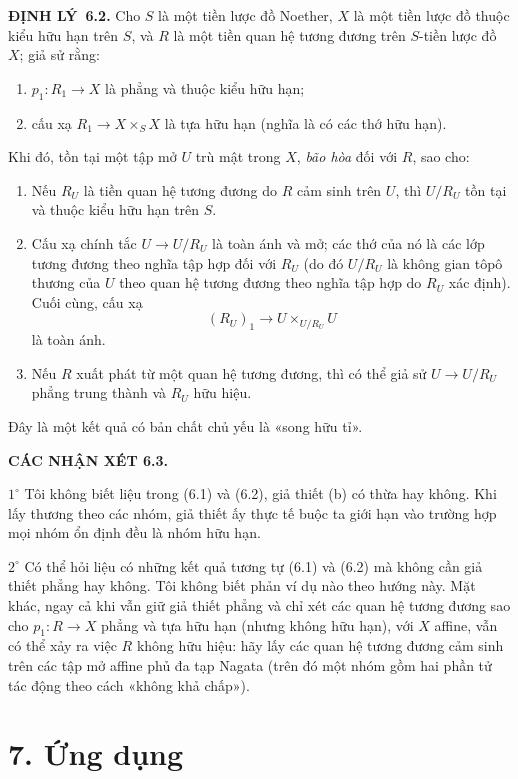 \documentclass[11pt,twoside,openany]{book}
\numberwithin{equation}{section}
\newcommand{\src}[1]{%
  \phantomsection\hypertarget{src:\fgasourceid:#1}{}%
  \marginpar{\raggedleft\footnotesize\sffamily #1}%
}
\newcommand{\fgasourceid}{unset}
\newcommand{\fsection}[2]{%
  \section*{#1. #2}%
  \addcontentsline{toc}{section}{#1. #2}%
}
\newcommand{\result}[2]{\par\medskip\noindent\textbf{#1\if\relax\detokenize{#2}\relax\else\ #2\fi.}\quad}
\begin{document}
\result{ĐỊNH LÝ}{6.2} Cho $S$ là một tiền lược đồ Noether, $X$ là một tiền
lược đồ thuộc kiểu hữu hạn trên $S$, và $R$ là một tiền quan hệ tương đương trên
$S$-tiền lược đồ $X$; giả sử rằng:
\begin{enumerate}
\item[(a)] $p_1:R_1\to X$ là phẳng và thuộc kiểu hữu hạn;
\item[(b)] cấu xạ $R_1\to X\times_S X$ là tựa hữu hạn (nghĩa là có các thớ
hữu hạn).
\end{enumerate}
Khi đó, tồn tại một tập mở $U$ trù mật trong $X$, \emph{bão hòa} đối với $R$,
sao cho:
\begin{enumerate}
\item[(i)] Nếu $R_U$ là tiền quan hệ tương đương do $R$ cảm sinh trên $U$,
thì $U/R_U$ tồn tại và thuộc kiểu hữu hạn trên $S$.

\item[(ii)] Cấu xạ chính tắc $U\to U/R_U$ là toàn ánh và mở; các thớ của nó
là các lớp tương đương theo nghĩa tập hợp đối với $R_U$ (do đó $U/R_U$ là
không gian tôpô thương của $U$ theo quan hệ tương đương theo nghĩa tập hợp do
$R_U$ xác định). Cuối cùng, cấu xạ
\[
  (R_U)_1\longrightarrow U\times_{U/R_U}U
\]
là toàn ánh.
\src{114}

\item[(iii)] Nếu $R$ xuất phát từ một quan hệ tương đương, thì có thể giả sử
$U\to U/R_U$ phẳng trung thành và $R_U$ hữu hiệu.
\end{enumerate}

Đây là một kết quả có bản chất chủ yếu là «song hữu tỉ».

\medskip
\noindent\textbf{CÁC NHẬN XÉT 6.3.}

\smallskip
\noindent $1^\circ$ Tôi không biết liệu trong (6.1) và (6.2), giả thiết (b) có
thừa hay không. Khi lấy thương theo các nhóm, giả thiết ấy thực tế buộc ta
giới hạn vào trường hợp mọi nhóm ổn định đều là nhóm hữu hạn.

\smallskip
\noindent $2^\circ$ Có thể hỏi liệu có những kết quả tương tự (6.1) và (6.2)
mà không cần giả thiết phẳng hay không. Tôi không biết phản ví dụ nào theo
hướng này. Mặt khác, ngay cả khi vẫn giữ giả thiết phẳng và chỉ xét các quan
hệ tương đương sao cho $p_1:R\to X$ phẳng và tựa hữu hạn (nhưng không hữu
hạn), với $X$ affine, vẫn có thể xảy ra việc $R$ không hữu hiệu: hãy lấy các
quan hệ tương đương cảm sinh trên các tập mở affine phủ đa tạp Nagata (trên đó
một nhóm gồm hai phần tử tác động theo cách «không khả chấp»).

\fsection{7}{Ứng dụng}
\end{document}
